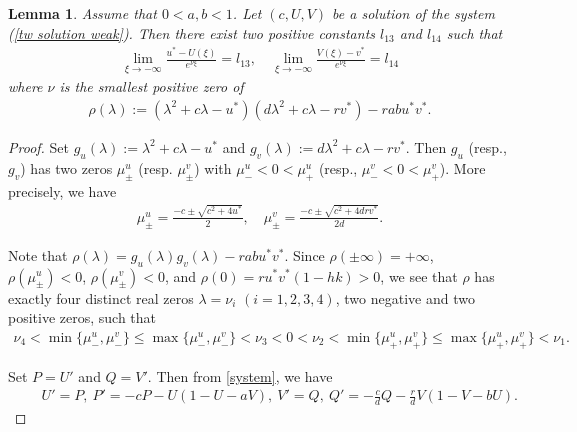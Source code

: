 \documentclass[11pt,a4paper]{article}
\newtheorem{lemma}[theorem]{\textbf{Lemma}}
\numberwithin{equation}{section}
\numberwithin{figure}{section}
\newcommand{\red}[1]{{\color{red}#1}}
\newcommand\bea{\begin{eqnarray}}
\newcommand\eea{\end{eqnarray}}
\newcommand\beaa{\begin{eqnarray*}}
\newcommand\eeaa{\end{eqnarray*}}
\begin{document}
\bigskip
\begin{lemma}\label{lem:AS-infty:b<1}
Assume that $0<a,b<1$.
Let $(c,U,V)$ be a solution of the system (\ref{tw solution weak}).
Then there exist two positive constants $l_{13}$ and $l_{14}$ such that
\beaa
\lim_{\xi\to-\infty}\frac{u^*-U(\xi)}{e^{\nu\xi}}=l_{13},\quad
\lim_{\xi\to-\infty}\frac{V(\xi)-v^*}{e^{\nu\xi}}=l_{14}
\eeaa
where
$\nu$ is the smallest positive zero of
\bea\label{chara-poly}
\rho(\lambda):=(\lambda^2+c\lambda-u^*)(d\lambda^2+c\lambda-rv^*)-rabu^*v^*.
\eea
\end{lemma}
\begin{proof}
Set
$g_u(\lambda):=\lambda^2+c\lambda-u^*$ and $g_v(\lambda):=d\lambda^2+c\lambda-rv^*$.
Then $g_u$ (resp., $g_v$) has two zeros $\mu^{u}_{\pm}$ (resp. $\mu^{v}_{\pm}$) with
$\mu^{u}_{-}<0< \mu^{u}_{+}$ (resp., $\mu^{v}_{-}<0< \mu^{v}_{+}$). More precisely, we have
\beaa
\mu^u_{\pm}=\frac{-c\pm\sqrt{c^2+4u^*}}{2},\quad \mu^v_{\pm}=\frac{-c\pm\sqrt{c^2+4drv^*}}{2d}.
\eeaa

Note that
$\rho(\lambda)=g_u(\lambda)g_v(\lambda)-rabu^*v^*$. Since $\rho(\pm\infty)=+\infty$,
$\rho(\mu^{u}_{\pm})<0$, $\rho(\mu^{v}_{\pm})<0$, and $\rho(0)=ru^*v^*(1-hk)>0$, we see that
$\rho$ has exactly four distinct real zeros $\lambda=\nu_i$ $(i=1,2,3,4)$, two negative and two positive zeros, such that
\beaa
\nu_4<\min\{\mu^{u}_{-},\mu^{v}_{-} \}\leq \max\{\mu^{u}_{-},\mu^{v}_{-} \}<\nu_3<0<\nu_2
<\min\{\mu^{u}_{+},\mu^{v}_{+} \}\leq \max\{\mu^{u}_{+},\mu^{v}_{+} \}<\nu_1.
\eeaa

Set $P=U'$ and $Q=V'$.
Then from \eqref{system}, we have
\bea\label{X-sys}
\qquad U'= P, \ P'=-c P-U(1-U-a V),\ V'= Q,
\ Q'=-\frac{c}{d}Q-\frac{r}{d}V(1-V-bU).
\eea


\end{proof}
\end{document}
